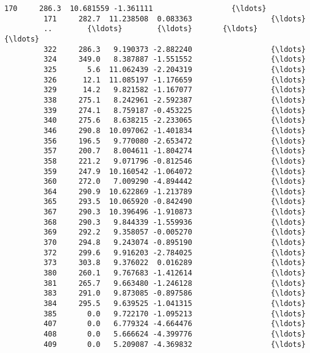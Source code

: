 \documentclass[11pt]{article}
\begin{document}
\begin{Verbatim}[commandchars=\\\{\}]
         170     286.3  10.681559 -1.361111                  {\ldots}                    
         171     282.7  11.238508  0.083363                  {\ldots}                    
         ..        {\ldots}        {\ldots}       {\ldots}                  {\ldots}                    
         322     286.3   9.190373 -2.882240                  {\ldots}                    
         324     349.0   8.387887 -1.551552                  {\ldots}                    
         325       5.6  11.062439 -2.204319                  {\ldots}                    
         326      12.1  11.085197 -1.176659                  {\ldots}                    
         329      14.2   9.821582 -1.167077                  {\ldots}                    
         338     275.1   8.242961 -2.592387                  {\ldots}                    
         339     274.1   8.759187 -0.453225                  {\ldots}                    
         340     275.6   8.638215 -2.233065                  {\ldots}                    
         346     290.8  10.097062 -1.401834                  {\ldots}                    
         356     196.5   9.770080 -2.653472                  {\ldots}                    
         357     200.7   8.004611 -1.804274                  {\ldots}                    
         358     221.2   9.071796 -0.812546                  {\ldots}                    
         359     247.9  10.160542 -1.064072                  {\ldots}                    
         360     272.0   7.009290 -4.894442                  {\ldots}                    
         364     290.9  10.622869 -1.213789                  {\ldots}                    
         365     293.5  10.065920 -0.842490                  {\ldots}                    
         367     290.3  10.396496 -1.910873                  {\ldots}                    
         368     290.3   9.844339 -1.559936                  {\ldots}                    
         369     292.2   9.358057 -0.005270                  {\ldots}                    
         370     294.8   9.243074 -0.895190                  {\ldots}                    
         372     299.6   9.916203 -2.784025                  {\ldots}                    
         373     303.8   9.376022  0.016289                  {\ldots}                    
         380     260.1   9.767683 -1.412614                  {\ldots}                    
         381     265.7   9.663480 -1.246128                  {\ldots}                    
         383     291.0   9.873085 -0.897586                  {\ldots}                    
         384     295.5   9.639525 -1.041315                  {\ldots}                    
         385       0.0   9.722170 -1.095213                  {\ldots}                    
         407       0.0   6.779324 -4.664476                  {\ldots}                    
         408       0.0   5.666624 -4.399776                  {\ldots}                    
         409       0.0   5.209087 -4.369832                  {\ldots}                    
         

\end{Verbatim}
\end{document}
